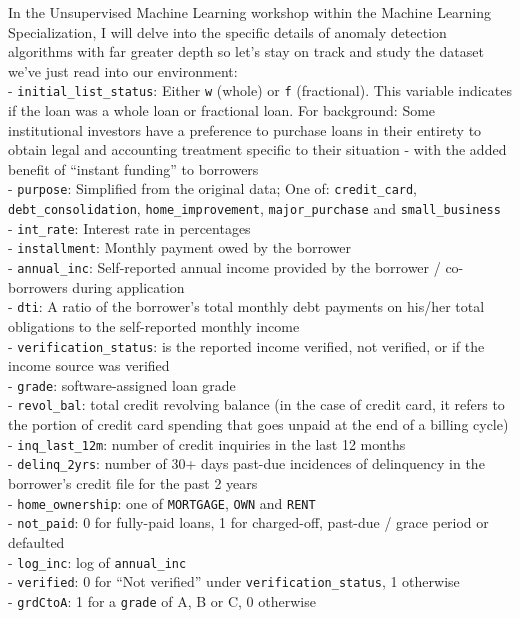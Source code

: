 \documentclass[
]{article}
\begin{document}
In the Unsupervised Machine Learning workshop within the Machine
Learning Specialization, I will delve into the specific details of
anomaly detection algorithms with far greater depth so let's stay on
track and study the dataset we've just read into our environment:\\
- \texttt{initial\_list\_status}: Either \texttt{w} (whole) or
\texttt{f} (fractional). This variable indicates if the loan was a whole
loan or fractional loan. For background: Some institutional investors
have a preference to purchase loans in their entirety to obtain legal
and accounting treatment specific to their situation - with the added
benefit of ``instant funding'' to borrowers\\
- \texttt{purpose}: Simplified from the original data; One of:
\texttt{credit\_card}, \texttt{debt\_consolidation},
\texttt{home\_improvement}, \texttt{major\_purchase} and
\texttt{small\_business}\\
- \texttt{int\_rate}: Interest rate in percentages\\
- \texttt{installment}: Monthly payment owed by the borrower\\
- \texttt{annual\_inc}: Self-reported annual income provided by the
borrower / co-borrowers during application\\
- \texttt{dti}: A ratio of the borrower's total monthly debt payments on
his/her total obligations to the self-reported monthly income\\
- \texttt{verification\_status}: is the reported income verified, not
verified, or if the income source was verified\\
- \texttt{grade}: software-assigned loan grade\\
- \texttt{revol\_bal}: total credit revolving balance (in the case of
credit card, it refers to the portion of credit card spending that goes
unpaid at the end of a billing cycle)\\
- \texttt{inq\_last\_12m}: number of credit inquiries in the last 12
months\\
- \texttt{delinq\_2yrs}: number of 30+ days past-due incidences of
delinquency in the borrower's credit file for the past 2 years\\
- \texttt{home\_ownership}: one of \texttt{MORTGAGE}, \texttt{OWN} and
\texttt{RENT}\\
- \texttt{not\_paid}: 0 for fully-paid loans, 1 for charged-off,
past-due / grace period or defaulted\\
- \texttt{log\_inc}: log of \texttt{annual\_inc}\\
- \texttt{verified}: 0 for ``Not verified'' under
\texttt{verification\_status}, 1 otherwise\\
- \texttt{grdCtoA}: 1 for a \texttt{grade} of A, B or C, 0 otherwise
\end{document}
